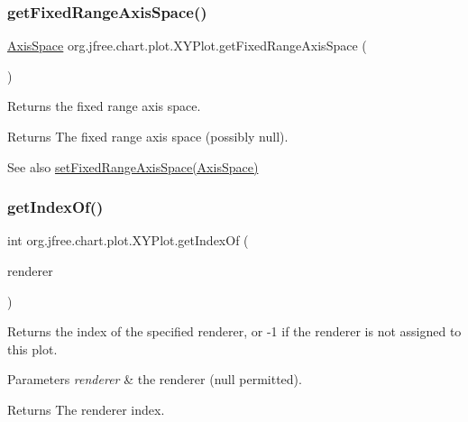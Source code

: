 \subsubsection{\texorpdfstring{get\+Fixed\+Range\+Axis\+Space()}{getFixedRangeAxisSpace()}}
{\footnotesize\ttfamily \mbox{\hyperlink{classorg_1_1jfree_1_1chart_1_1axis_1_1_axis_space}{Axis\+Space}} org.\+jfree.\+chart.\+plot.\+X\+Y\+Plot.\+get\+Fixed\+Range\+Axis\+Space (\begin{DoxyParamCaption}{ }\end{DoxyParamCaption})}

Returns the fixed range axis space.

\begin{DoxyReturn}{Returns}
The fixed range axis space (possibly {\ttfamily null}).
\end{DoxyReturn}
\begin{DoxySeeAlso}{See also}
\mbox{\hyperlink{classorg_1_1jfree_1_1chart_1_1plot_1_1_x_y_plot_a911cdf973fd36671c538cf41d42a0741}{set\+Fixed\+Range\+Axis\+Space(\+Axis\+Space)}} 
\end{DoxySeeAlso}
\mbox{\label{classorg_1_1jfree_1_1chart_1_1plot_1_1_x_y_plot_a9169a21c1d3f709a3cb2a3afadcde09a}} 
\subsubsection{\texorpdfstring{get\+Index\+Of()}{getIndexOf()}}
{\footnotesize\ttfamily int org.\+jfree.\+chart.\+plot.\+X\+Y\+Plot.\+get\+Index\+Of (\begin{DoxyParamCaption}\item[{\mbox{\hyperlink{interfaceorg_1_1jfree_1_1chart_1_1renderer_1_1xy_1_1_x_y_item_renderer}{X\+Y\+Item\+Renderer}}}]{renderer }\end{DoxyParamCaption})}

Returns the index of the specified renderer, or {\ttfamily -\/1} if the renderer is not assigned to this plot.


\begin{DoxyParams}{Parameters}
{\em renderer} & the renderer ({\ttfamily null} permitted).\\
\hline
\end{DoxyParams}
\begin{DoxyReturn}{Returns}
The renderer index. 
\end{DoxyReturn}
\mbox{\label{classorg_1_1jfree_1_1chart_1_1plot_1_1_x_y_plot_a6c69d52c6e874aa6c6a854951c8e0aa2}} 
